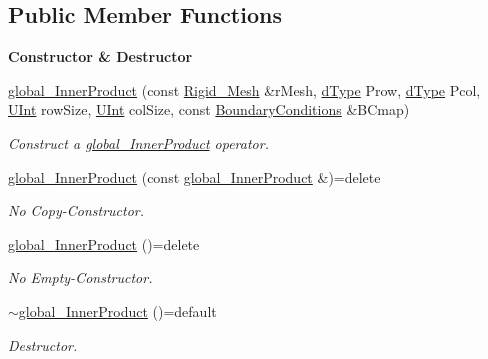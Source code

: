 \subsection*{Public Member Functions}
\begin{Indent}{\bf Constructor \& Destructor}\par
\begin{DoxyCompactItemize}
\item 
\hyperlink{classFVCode3D_1_1global__InnerProduct_a17257f96b178ee259b159d60c268429c}{global\+\_\+\+Inner\+Product} (const \hyperlink{classFVCode3D_1_1Rigid__Mesh}{Rigid\+\_\+\+Mesh} \&r\+Mesh, \hyperlink{classFVCode3D_1_1global__Operator_a9e94fbe56b84ba80f9e9be56c808e5c3}{d\+Type} Prow, \hyperlink{classFVCode3D_1_1global__Operator_a9e94fbe56b84ba80f9e9be56c808e5c3}{d\+Type} Pcol, \hyperlink{namespaceFVCode3D_a4bf7e328c75d0fd504050d040ebe9eda}{U\+Int} row\+Size, \hyperlink{namespaceFVCode3D_a4bf7e328c75d0fd504050d040ebe9eda}{U\+Int} col\+Size, const \hyperlink{classFVCode3D_1_1BoundaryConditions}{Boundary\+Conditions} \&B\+Cmap)
\begin{DoxyCompactList}\small\item\em Construct a \hyperlink{classFVCode3D_1_1global__InnerProduct}{global\+\_\+\+Inner\+Product} operator. \end{DoxyCompactList}\item 
\hyperlink{classFVCode3D_1_1global__InnerProduct_a471716cd776be590b7654665ce89d6ad}{global\+\_\+\+Inner\+Product} (const \hyperlink{classFVCode3D_1_1global__InnerProduct}{global\+\_\+\+Inner\+Product} \&)=delete
\begin{DoxyCompactList}\small\item\em No Copy-\/\+Constructor. \end{DoxyCompactList}\item 
\hyperlink{classFVCode3D_1_1global__InnerProduct_aadb65a50dd419d5e81ab7587d3850c57}{global\+\_\+\+Inner\+Product} ()=delete
\begin{DoxyCompactList}\small\item\em No Empty-\/\+Constructor. \end{DoxyCompactList}\item 
\hyperlink{classFVCode3D_1_1global__InnerProduct_a506223208f859208a5dd3256f60278bf}{$\sim$global\+\_\+\+Inner\+Product} ()=default
\begin{DoxyCompactList}\small\item\em Destructor. \end{DoxyCompactList}\end{DoxyCompactItemize}
\end{Indent}
